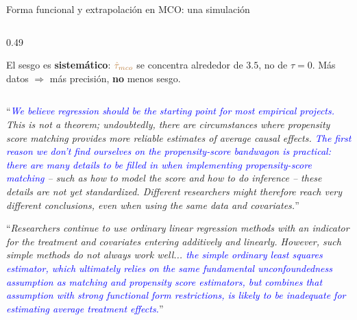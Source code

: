 \documentclass[10pt, xcolor=dvipsnames]{beamer}
\begin{document}
\begin{frame}{Forma funcional y extrapolación en MCO: una simulación}
\begin{itemize}
\begin{columns}[T,onlytextwidth]
\begin{column}{0.49\textwidth}
\par\smallskip
\raggedright\footnotesize
El sesgo es \textbf{sistemático}: \(\textcolor{brown}{\hat\tau_{mco}}\) se concentra alrededor de \(3.5\), no de \(\tau=0\). Más datos \(\Rightarrow\) más precisión, \textbf{no} menos sesgo.
\end{column}
\end{columns}
\end{itemize}
\end{frame}


\begin{frame}
\begin{tcolorbox}[colback=white, title=\citet{Angrist2008}, arc=0mm,boxrule=0.5pt, breakable]
``\textit{\textcolor{blue}{We believe regression should be the starting point for most empirical projects.} This is not a theorem; undoubtedly, there are circumstances where propensity  score matching provides more reliable estimates of average causal effects. \textcolor{blue}{The first reason we don’t find ourselves on the propensity-score bandwagon is practical: there are many details to be filled in when implementing propensity-score matching} – such as how to model the score and how to do inference – these details are not yet standardized. Different researchers might therefore reach very different conclusions, even when using the same data and covariates.}''
\end{tcolorbox}
\end{frame}


\begin{frame}
\begin{tcolorbox}[colback=white, title=\citet{Imbens2015a}, arc=0mm,boxrule=0.5pt, breakable]
``\textit{Researchers continue to use ordinary linear regression methods with an indicator for the treatment and covariates entering additively and linearly. However, such simple methods do not always work well... \textcolor{blue}{the simple ordinary least squares estimator, which ultimately relies on the same fundamental unconfoundedness assumption as matching and propensity score estimators, but combines that assumption with strong functional form restrictions, is likely to be inadequate for estimating average treatment effects.}}''
\end{tcolorbox}
\end{frame}
\end{document}
